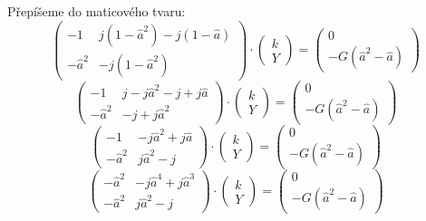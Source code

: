 \documentclass{article}
\begin{document}
Přepíšeme do maticového tvaru:
$$
    \begin{pmatrix}
        -1         & j (1 - \hat{a}^2) - j (1 - \hat{a}) \\
        -\hat{a}^2 & - j (1 - \hat{a}^2)
    \end{pmatrix}
    \cdot
    \begin{pmatrix}
        k \\
        Y
    \end{pmatrix}
    =
    \begin{pmatrix}
        0 \\
        -G (\hat{a}^2 - \hat{a})
    \end{pmatrix}
$$
$$
    \begin{pmatrix}
        -1         & j - j \hat{a}^2 - j + j \hat{a} \\
        -\hat{a}^2 & - j + j \hat{a}^2
    \end{pmatrix}
    \cdot
    \begin{pmatrix}
        k \\
        Y
    \end{pmatrix}
    =
    \begin{pmatrix}
        0 \\
        - G (\hat{a}^2 - \hat{a})
    \end{pmatrix}
$$
$$
    \begin{pmatrix}
        -1         & - j \hat{a}^2 + j \hat{a} \\
        -\hat{a}^2 & j \hat{a}^2 - j
    \end{pmatrix}
    \cdot
    \begin{pmatrix}
        k \\
        Y
    \end{pmatrix}
    =
    \begin{pmatrix}
        0 \\
        - G (\hat{a}^2 - \hat{a})
    \end{pmatrix}
$$
$$
    \begin{pmatrix}
        -\hat{a}^2 & - j \hat{a}^4 + j \hat{a}^3 \\
        -\hat{a}^2 & j \hat{a}^2 - j
    \end{pmatrix}
    \cdot
    \begin{pmatrix}
        k \\
        Y
    \end{pmatrix}
    =
    \begin{pmatrix}
        0 \\
        - G (\hat{a}^2 - \hat{a})
    \end{pmatrix}
$$
\end{document}
